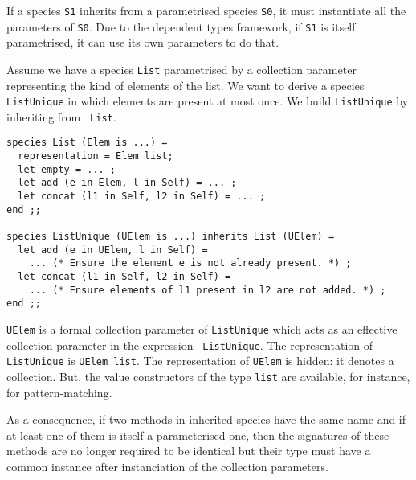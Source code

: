 \smallskip
{}
If a species {\tt S1} inherits from a parametrised species {\tt S0},
it must instantiate all the parameters of {\tt S0}. Due to the
dependent types framework, if {\tt S1} is itself
parametrised, it can use its own parameters to do that. 

Assume we
have a species {\tt List} parametrised by a collection parameter
representing the kind of elements of the list. We want to derive
a species {\tt ListUnique} in which elements are present at most
once. We build {\tt ListUnique} by inheriting from {\tt
  List}.

{\scriptsize
\begin{lstlisting}
species List (Elem is ...) =
  representation = Elem list;
  let empty = ... ;
  let add (e in Elem, l in Self) = ... ;
  let concat (l1 in Self, l2 in Self) = ... ;
end ;;

species ListUnique (UElem is ...) inherits List (UElem) =
  let add (e in UElem, l in Self) =
    ... (* Ensure the element e is not already present. *) ;
  let concat (l1 in Self, l2 in Self) =
    ... (* Ensure elements of l1 present in l2 are not added. *) ;
end ;;
\end{lstlisting}
} {\tt UElem} is a formal collection parameter of {\tt ListUnique}
which acts as an effective collection parameter in the expression {\tt
  ListUnique}. The representation of {\tt ListUnique} is {\tt UElem
  list}. The representation of {\tt UElem} is hidden: it denotes a
collection. But, the value constructors of the type {\tt list} are
available, for instance, for pattern-matching.  

As a consequence, if two methods in inherited species have the same
name and if at least one of them is itself a parameterised one, then
the signatures of these methods are no longer required to be identical
but their type must have a common instance after instanciation of the
collection parameters.

